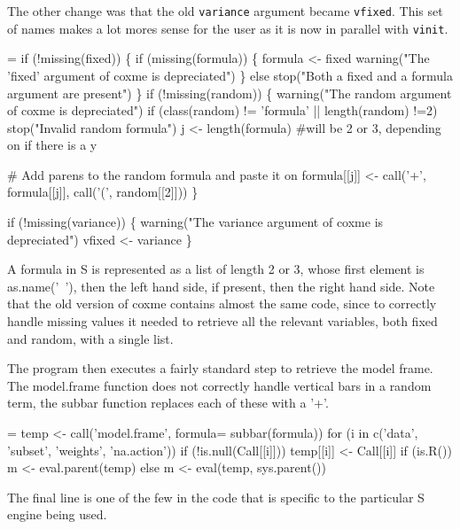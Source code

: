 \documentclass{article}
\begin{document}
The other change was that the old \Verb!variance! argument became \Verb?vfixed?.
This set of names makes a lot mores sense for the user as it is now
in parallel with \Verb!vinit!.
\begin{nwchunk}
=
 if (!missing(fixed)) \{
     if (missing(formula)) \{
         formula <- fixed
         warning("The 'fixed' argument of coxme is depreciated")
         \}
     else stop("Both a fixed and a formula argument are present")
     \}
 if (!missing(random)) \{
     warning("The random argument of coxme is depreciated")
     if (class(random) != 'formula' || length(random) !=2) 
         stop("Invalid random formula")
     j <- length(formula)   #will be 2 or 3, depending on if there is a y
 
     # Add parens to the random formula and paste it on
     formula[[j]] <- call('+', formula[[j]], call('(', random[[2]]))  
     \}
 
 if (!missing(variance)) \{
     warning("The variance argument of coxme is depreciated")
     vfixed <- variance
     \}
 
\end{nwchunk}
A formula in S is represented as a list of length 2 or 3, whose first element
is as.name('~'), then the left hand side, if present, then the right hand side.
Note that the old version of coxme contains almost the same code, since
to correctly handle missing values it needed to retrieve all the
relevant variables, both fixed and random, with a single list.

The program then executes a fairly standard step to retrieve the model
frame.  
The model.frame function does not correctly handle vertical bars in
a random term, the subbar function replaces each of these with a '+'.
\begin{nwchunk}
=
 temp <- call('model.frame', formula= subbar(formula))
 for (i in c('data', 'subset', 'weights', 'na.action'))
     if (!is.null(Call[[i]])) temp[[i]] <- Call[[i]]
 if (is.R()) m <- eval.parent(temp)
 else        m <- eval(temp, sys.parent())
\end{nwchunk}
The final line  is one of the few in the code that is specific to the
particular S engine being used.
\end{document}
